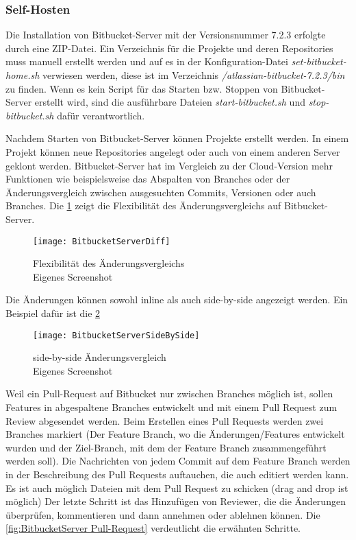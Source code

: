 \subsubsection{Self-Hosten}
\label{subsubsec:Bitbucket-self-host} 

Die Installation von Bitbucket-Server mit der Versionsnummer 7.2.3 erfolgte durch eine ZIP-Datei. Ein Verzeichnis für die Projekte und deren Repositories muss manuell erstellt werden und auf es in der Konfiguration-Datei \textit{set-bitbucket-home.sh} verwiesen werden, diese ist im Verzeichnis \textit{/atlassian-bitbucket-7.2.3/bin} zu finden. Wenn es kein Script für das Starten bzw. Stoppen von Bitbucket-Server erstellt wird, sind die ausführbare Dateien \textit{start-bitbucket.sh} und \textit{stop-bitbucket.sh} dafür verantwortlich.

Nachdem Starten von Bitbucket-Server können Projekte erstellt werden. In einem Projekt können neue Repositories angelegt oder auch von einem anderen Server geklont werden.
Bitbucket-Server hat im Vergleich zu der Cloud-Version mehr Funktionen wie beispielsweise das Abspalten von Branches oder der Änderungsvergleich zwischen ausgesuchten Commits, Versionen oder auch Branches. Die \cref{fig:Flexibilität des Änderungsvergleich} zeigt die Flexibilität des Änderungsvergleichs auf Bitbucket-Server.

\begin{figure}[H]
	\centering
	\texttt{[image: BitbucketServerDiff]}
	\caption[Flexibilität des Änderungsvergleichs auf Bitbucket-Server]{Flexibilität des Änderungsvergleichs \\Eigenes Screenshot}
	\label{fig:Flexibilität des Änderungsvergleich}
\end{figure}

Die Änderungen können sowohl inline als auch side-by-side angezeigt werden. Ein Beispiel dafür ist die \cref{fig:BitbucketServerSideBySide}

\begin{figure}[H]
	\centering
	\texttt{[image: BitbucketServerSideBySide]}
	\caption[side-by-side Änderungsvergleich auf Bitbucket-Server]{side-by-side Änderungsvergleich\\Eigenes Screenshot}
	\label{fig:BitbucketServerSideBySide}
\end{figure}

Weil ein Pull-Request auf Bitbucket nur zwischen Branches möglich ist, sollen Features in abgespaltene Branches entwickelt und mit einem Pull Request zum Review abgesendet werden. Beim Erstellen eines Pull Requests werden zwei Branches markiert (Der Feature Branch, wo die Änderungen/Features entwickelt wurden und der Ziel-Branch, mit dem der Feature Branch zusammengeführt werden soll). Die Nachrichten von jedem Commit auf dem Feature Branch werden in der Beschreibung des Pull Requests auftauchen, die auch editiert werden kann. Es ist auch möglich Dateien mit dem Pull Request zu schicken (drag and drop ist möglich)
Der letzte Schritt ist das Hinzufügen von Reviewer, die die Änderungen überprüfen, kommentieren und dann annehmen oder ablehnen können. Die \cref{fig:BitbucketServer Pull-Request} verdeutlicht die erwähnten Schritte.

